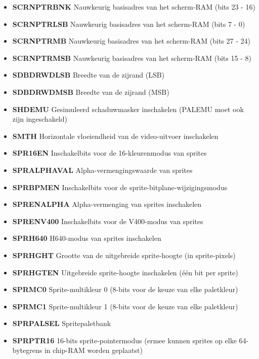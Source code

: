 \begin{itemize}
\item{\bf{SCRNPTRBNK}} Nauwkeurig basisadres van het scherm-RAM (bits 23 - 16)
\item{\bf{SCRNPTRLSB}} Nauwkeurig basisadres van het scherm-RAM (bits 7 - 0)
\item{\bf{SCRNPTRMB}} Nauwkeurig basisadres van het scherm-RAM (bits 27 - 24)
\item{\bf{SCRNPTRMSB}} Nauwkeurig basisadres van het scherm-RAM (bits 15 - 8)
\item{\bf{SDBDRWDLSB}} Breedte van de zijrand (LSB)
\item{\bf{SDBDRWDMSB}} Breedte van de zijrand (MSB)
\item{\bf{SHDEMU}} Gesimuleerd schaduwmasker inschakelen (PALEMU moet ook zijn ingeschakeld)
\item{\bf{SMTH}} Horizontale vloeiendheid van de video-uitvoer inschakelen
\item{\bf{SPR16EN}} Inschakelbits voor de 16-kleurenmodus van sprites
\item{\bf{SPRALPHAVAL}} Alpha-vermengingswaarde van sprites
\item{\bf{SPRBPMEN}} Inschakelbits voor de sprite-bitplane-wijzigingsmodus
\item{\bf{SPRENALPHA}} Alpha-vermenging van sprites inschakelen
\item{\bf{SPRENV400}} Inschakelbits voor de V400-modus van sprites
\item{\bf{SPRH640}} H640-modus van sprites inschakelen
\item{\bf{SPRHGHT}} Grootte van de uitgebreide sprite-hoogte (in sprite-pixels)
\item{\bf{SPRHGTEN}} Uitgebreide sprite-hoogte inschakelen (één bit per sprite)
\item{\bf{SPRMC0}} Sprite-multikleur 0 (8-bits voor de keuze van elke paletkleur)
\item{\bf{SPRMC1}} Sprite-multikleur 1 (8-bits voor de keuze van elke paletkleur)
\item{\bf{SPRPALSEL}} Spritepaletbank
\item{\bf{SPRPTR16}} 16-bits sprite-pointermodus (ermee kunnen sprites op elke 64-bytegrens in chip-RAM worden geplaatst)

\end{itemize}
